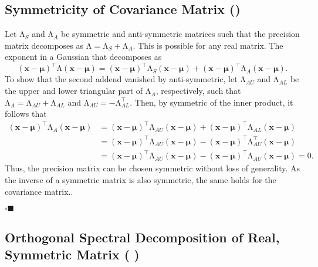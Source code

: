 \documentclass[11pt, a4paper]{scrartcl}
\newcommand{\transposed}{{\!\top\!}}
\renewcommand{\vec}[1]{\bm{#1}}
\newcommand{\mat}[1]{\bm{\mathrm{#1}}}
\newcommand{\qedeot}{\hfill\(\square\blacksquare\)}
\newcommand{\diffstar}{\texorpdfstring{\raisebox{-1pt}{\resizebox{!}{8pt}{\(\star\)}}}{*}}
\newcommand{\onestar}  {(\diffstar)}
\newcommand{\threestar}{(\diffstar\,\diffstar\,\diffstar)}
\begin{document}
		\subsection{Symmetricity of Covariance Matrix  \onestar}
			Let \( \mat{\Lambda}_S \) and \( \mat{\Lambda}_A \) be symmetric and anti-symmetric matrices such that the precision matrix decomposes as \( \mat{\Lambda} = \mat{\Lambda}_S + \mat{\Lambda}_A \). This is possible for any real matrix. The exponent in a Gaussian that decomposes as
			\begin{equation}
				(\vec{x} - \vec{\mu})^\transposed \mat{\Lambda} (\vec{x} - \vec{\mu})
					= (\vec{x} - \vec{\mu})^\transposed \mat{\Lambda}_S (\vec{x} - \vec{\mu})
					+ (\vec{x} - \vec{\mu})^\transposed \mat{\Lambda}_A (\vec{x} - \vec{\mu}).
			\end{equation}
			To show that the second addend vanished by anti-symmetric, let \( \mat{\Lambda}_{AU} \) and \( \mat{\Lambda}_{AL} \) be the upper and lower triangular part of \( \mat{\Lambda}_A \), respectively, such that \( \mat{\Lambda}_A = \mat{\Lambda}_{AU} + \mat{\Lambda}_{AL} \) and \( \mat{\Lambda}_{AU} = -\mat{\Lambda}_{AL}^\transposed \). Then, by symmetric of the inner product, it follows that
			\begin{align}
				(\vec{x} - \vec{\mu})^\transposed \mat{\Lambda}_A (\vec{x} - \vec{\mu})
					&= (\vec{x} - \vec{\mu})^\transposed \mat{\Lambda}_{AU} (\vec{x} - \vec{\mu}) + (\vec{x} - \vec{\mu})^\transposed \mat{\Lambda}_{AL} (\vec{x} - \vec{\mu}) \\
					&= (\vec{x} - \vec{\mu})^\transposed \mat{\Lambda}_{AU} (\vec{x} - \vec{\mu}) - (\vec{x} - \vec{\mu})^\transposed \mat{\Lambda}_{AU}^\transposed (\vec{x} - \vec{\mu}) \\
					&= (\vec{x} - \vec{\mu})^\transposed \mat{\Lambda}_{AU} (\vec{x} - \vec{\mu}) - (\vec{x} - \vec{\mu})^\transposed \mat{\Lambda}_{AU} (\vec{x} - \vec{\mu})
					 = 0.
			\end{align}
			Thus, the precision matrix can be chosen symmetric without loss of generality. As the inverse of a symmetric matrix is also symmetric, the same holds for the covariance matrix..

			\qedeot

		\subsection{Orthogonal Spectral Decomposition of Real, Symmetric Matrix  \threestar}
\end{document}
